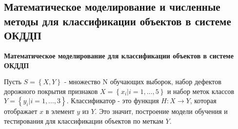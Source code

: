 \documentclass[a4paper,14pt]{extreport}
\begin{document}
%
%
\subsection{Математическое моделирование и численные методы для классификации объектов в системе ОКДДП}
\textbf{Математическое моделирование для классификации объектов в системе ОКДДП}

Пусть $S=\left\{X, Y\right\}$ - множество N обучающих выборок, набор дефектов дорожного покрытия признаков $X=\left\{x_i | i = 1, ..., 5\right\}$ и набор меток классов $Y = \left\{y_i |i = 1, ..., 3\right\}$. Классификатор - это функция $H: X \rightarrow Y$, которая отображает $x$ в элемент $y$ из $Y$. Это значит, построение модели обучения и тестирования для классификации объектов по меткам $Y$.
\end{document}
